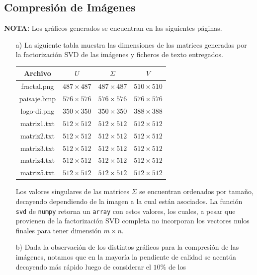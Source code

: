 \documentclass[spanish, fleqn]{article}
\begin{document}
	\subsection{Compresión de Imágenes}
	\textbf{NOTA:} Los gráficos generados se encuentran en las siguientes 
	páginas.
	\begin{enumerate}
		\item[a)]
			La siguiente tabla muestra las dimensiones de las matrices
			generadas por la factorización SVD de las imágenes y ficheros de 
			texto entregados.
			\begin{center}
				\begin{tabular}{|c|c|c|c|}
					\hline
						\textbf{Archivo} & $U$ & $\Sigma$ & $V$ \\
					\hline
						fractal.png & $487\times 487$ & $487\times 487$ &
						$510\times 510$ \\
					\hline
						paisaje.bmp & $576\times 576$ & $576\times 576$ & 
						$576\times 576$ \\
					\hline
						logo-di.png & $350\times 350$ & $350\times 350$ &
						$388\times 388$ \\
					\hline
						matriz1.txt & $512\times 512$ & $512\times 512$ &
						$512\times 512$ \\
					\hline
						matriz2.txt & $512\times 512$ & $512\times 512$ &
						$512\times 512$ \\
					\hline
						matriz3.txt & $512\times 512$ & $512\times 512$ &
						$512\times 512$ \\
					\hline
						matriz4.txt & $512\times 512$ & $512\times 512$ &
						$512\times 512$ \\
					\hline
						matriz5.txt & $512\times 512$ & $512\times 512$ &
						$512\times 512$ \\
					\hline
				\end{tabular}
			\end{center}
			Los valores singulares de las matrices $\Sigma$ se encuentran
			ordenados por tamaño, decayendo dependiendo de la imagen a la cual
			están asociados. La función \texttt{svd} de \texttt{numpy} retorna
			un \texttt{array} con estos valores, los cuales, a pesar que
			provienen de la factorización SVD completa no incorporan los
			vectores nulos finales para tener dimensión $m\times n$.
		\item[b)]
			Dada la observación de los distintos gráficos para la compresión de
			las imágenes, notamos que en la mayoría la pendiente de calidad se
			acentúa decayendo más rápido luego de considerar el $10\%$ de los

\end{enumerate}
\end{document}
